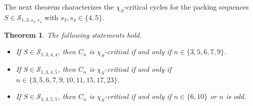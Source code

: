 \documentclass[12pt]{article}
\newtheorem{theorem}{Theorem}[section]
\begin{document}
The next theorem characterizes the $\chi_S$-critical cycles for the packing sequences 
$S \in \mathcal S_{1,3,s_3,s_4}$ with $s_3,s_4 \in \{4,5\}$.

\begin{theorem} \label{thm-4.2}
The following statements hold.

	\begin{itemize}
		
		\item[$(i)$] 	If $S \in \mathcal{S}_{1,3,4,4}$, then $C_n$ is $\chi_S$-critical if and only if $n \in \{3, 5, 6, 7, 9\}$.
		
		\item[$(ii)$] If $S \in \mathcal{S}_{1,3,4,5}$, then $C_n$ is $\chi_S$-critical if and only if $n \in \{3, 5, 6, 7, 9, 10, 11, \allowbreak 15,  17, 23\}$.
		
		\item[$(iii)$] 	If $S \in \mathcal{S}_{1,3,5,5}$, then $C_n$ is $\chi_S$-critical if and only if $n \in \{6 ,10\}$ or $n$ is odd.
	\end{itemize}
\end{theorem}
\end{document}
